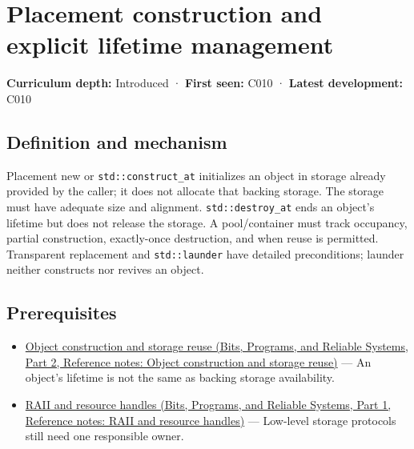 \hypertarget{appendix-f56c3e43fd4e}{}\label{referencestart:appendix-f56c3e43fd4e}
\section{Placement construction and explicit lifetime management}\label{appendix-f56c3e43fd4e-placement-construction-and-explicit-lifetime-management}

\hypertarget{appendix-f56c3e43fd4e-placement-construction-and-explicit-lifetime-management}{}

\textbf{Curriculum depth:} Introduced · \textbf{First seen:} C010 · \textbf{Latest development:} C010

\begin{allmightroledefinition}

\subsection{Definition and mechanism}\label{appendix-f56c3e43fd4e-definition-and-mechanism}

\hypertarget{appendix-f56c3e43fd4e-definition-and-mechanism}{}

Placement new or \texttt{std::construct\_at} initializes an object in storage already provided by the caller; it does not allocate that backing storage. The storage must have adequate size and alignment. \texttt{std::destroy\_at} ends an object's lifetime but does not release the storage. A pool/container must track occupancy, partial construction, exactly-once destruction, and when reuse is permitted. Transparent replacement and \texttt{std::launder} have detailed preconditions; launder neither constructs nor revives an object.

\end{allmightroledefinition}

\subsection{Prerequisites}\label{appendix-f56c3e43fd4e-prerequisites}

\hypertarget{appendix-f56c3e43fd4e-prerequisites}{}

\begin{itemize}
\tightlist
\item
  \href{../01-Bits-Programs-and-Reliable-Systems-P02/main.pdf\#nameddest=appendix-a82f9c438857}{Object construction and storage reuse (Bits, Programs, and Reliable Systems, Part 2, Reference notes: Object construction and storage reuse)} --- An object's lifetime is not the same as backing storage availability.
\item
  \href{../01-Bits-Programs-and-Reliable-Systems-P01/main.pdf\#nameddest=appendix-69739d3ab49b}{RAII and resource handles (Bits, Programs, and Reliable Systems, Part 1, Reference notes: RAII and resource handles)} --- Low-level storage protocols still need one responsible owner.
\end{itemize}

